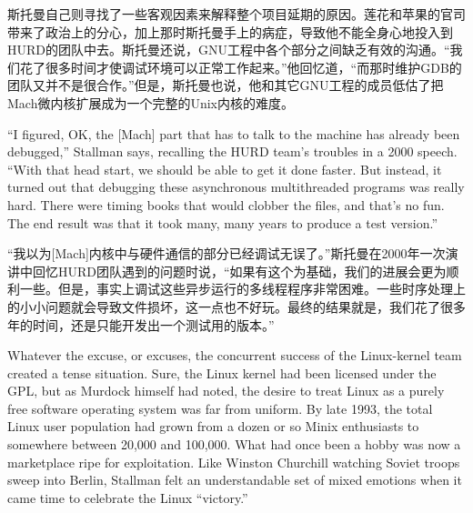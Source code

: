\ifdefined\chs
斯托曼自己则寻找了一些客观因素来解释整个项目延期的原因。莲花和苹果的官司带来了政治上的分心，加上那时斯托曼手上的病症，导致他不能全身心地投入到HURD的团队中去。斯托曼还说，GNU工程中各个部分之间缺乏有效的沟通。``我们花了很多时间才使调试环境可以正常工作起来。''他回忆道，``而那时维护GDB的团队又并不是很合作。''但是，斯托曼也说，他和其它GNU工程的成员低估了把Mach微内核扩展成为一个完整的Unix内核的难度。
\fi

\ifdefined\eng
``I figured, OK, the [Mach] part that has to talk to the machine has already been debugged,'' Stallman says, recalling the HURD team's troubles in a 2000 speech. ``With that head start, we should be able to get it done faster. But instead, it turned out that debugging these asynchronous multithreaded programs was really hard. There were timing books that would clobber the files, and that's no fun. The end result was that it took many, many years to produce a test version.''
\fi

\ifdefined\chs
``我以为[Mach]内核中与硬件通信的部分已经调试无误了。''斯托曼在2000年一次演讲中回忆HURD团队遇到的问题时说，``如果有这个为基础，我们的进展会更为顺利一些。但是，事实上调试这些异步运行的多线程程序非常困难。一些时序处理上的小小问题就会导致文件损坏，这一点也不好玩。最终的结果就是，我们花了很多年的时间，还是只能开发出一个测试用的版本。''
\fi

\ifdefined\eng
Whatever the excuse, or excuses, the concurrent success of the Linux-kernel team created a tense situation. Sure, the Linux kernel had been licensed under the GPL, but as Murdock himself had noted, the desire to treat Linux as a purely free software operating system was far from uniform. By late 1993, the total Linux user population had grown from a dozen or so Minix enthusiasts to somewhere between 20,000 and 100,000. What had once been a hobby was now a marketplace ripe for exploitation. Like Winston Churchill watching Soviet troops sweep into Berlin, Stallman felt an understandable set of mixed emotions when it came time to celebrate the Linux ``victory.''
\fi

